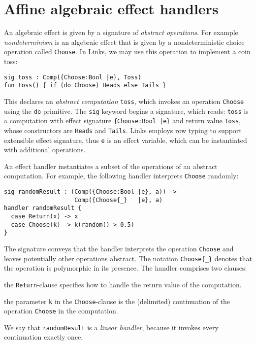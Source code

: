 \documentclass[preprint,numbers]{sigplanconf}
\begin{document}
\section{Affine algebraic effect handlers}
An algebraic effect is given by a signature of \emph{abstract
  operations}. For example \emph{nondeterminism} is an algebraic
effect that is given by a nondeterministic choice operation called
\lstinline$Choose$. In Links, we may use this operation to implement a
coin toss:
\begin{lstlisting}
sig toss : Comp({Choose:Bool |e}, Toss)
fun toss() { if (do Choose) Heads else Tails }
\end{lstlisting}
This declares an \emph{abstract computation} \lstinline$toss$, which
invokes an operation \lstinline$Choose$ using the \lstinline$do$
primitive.  The \lstinline$sig$ keyword begins a signature, which
reads: \lstinline$toss$ is a computation with effect signature
\lstinline${Choose:Bool |e}$ and return value \lstinline$Toss$, whose
constructors are \lstinline$Heads$ and \lstinline$Tails$.  Links
employs row typing to support extensible effect signature, thus
\lstinline$e$ is an effect variable, which can be instantiated with
additional operations.

An effect handler instantiates a subset of the operations of an
abstract computation. For example, the following handler interprets
\lstinline$Choose$ randomly:
\begin{lstlisting}
sig randomResult : (Comp({Choose:Bool |e}, a)) -> 
                    Comp({Choose{_}   |e}, a)
handler randomResult {
  case Return(x) -> x
  case Choose(k) -> k(random() > 0.5)
}
\end{lstlisting}
The signature conveys that the handler interprets the operation
\lstinline$Choose$ and leaves potentially other operations
abstract. The notation \lstinline$Choose{_}$ denotes that the
operation is polymorphic in its presence.  The handler comprises two
clauses:
\begin{enumerate*}[label={\roman*)}]
\item the \lstinline$Return$-clause specifies how to handle the return
  value of the computation.
\item the parameter \lstinline$k$ in the \lstinline$Choose$-clause is
  the (delimited) continuation of the operation \lstinline$Choose$ in the
  computation.
\end{enumerate*}
We say that \lstinline$randomResult$ is a \emph{linear handler}, because
it invokes every continuation exactly once.
\end{document}

